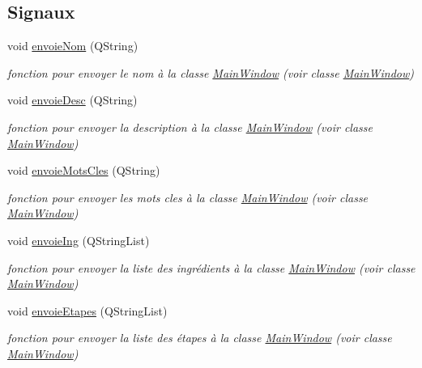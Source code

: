 \subsection*{Signaux}
\begin{DoxyCompactItemize}
\item 
void \hyperlink{classTraitement_ab958dbb923cb1b905c260c4f54907169}{envoie\+Nom} (Q\+String)
\begin{DoxyCompactList}\small\item\em fonction pour envoyer le nom à la classe \hyperlink{classMainWindow}{Main\+Window} (voir classe \hyperlink{classMainWindow}{Main\+Window}) \end{DoxyCompactList}\item 
void \hyperlink{classTraitement_a81d1717924fb7a206df394afae4e19dc}{envoie\+Desc} (Q\+String)
\begin{DoxyCompactList}\small\item\em fonction pour envoyer la description à la classe \hyperlink{classMainWindow}{Main\+Window} (voir classe \hyperlink{classMainWindow}{Main\+Window}) \end{DoxyCompactList}\item 
void \hyperlink{classTraitement_a4df691c4f46371e6c2b6b4c4df102819}{envoie\+Mots\+Cles} (Q\+String)
\begin{DoxyCompactList}\small\item\em fonction pour envoyer les mots cles à la classe \hyperlink{classMainWindow}{Main\+Window} (voir classe \hyperlink{classMainWindow}{Main\+Window}) \end{DoxyCompactList}\item 
void \hyperlink{classTraitement_a8db23635eb895875b0f60acece723df4}{envoie\+Ing} (Q\+String\+List)
\begin{DoxyCompactList}\small\item\em fonction pour envoyer la liste des ingrédients à la classe \hyperlink{classMainWindow}{Main\+Window} (voir classe \hyperlink{classMainWindow}{Main\+Window}) \end{DoxyCompactList}\item 
void \hyperlink{classTraitement_ae58a2b32e2632bfc11a696c186ace3b7}{envoie\+Etapes} (Q\+String\+List)
\begin{DoxyCompactList}\small\item\em fonction pour envoyer la liste des étapes à la classe \hyperlink{classMainWindow}{Main\+Window} (voir classe \hyperlink{classMainWindow}{Main\+Window}) \end{DoxyCompactList}\item 

\end{DoxyCompactItemize}
